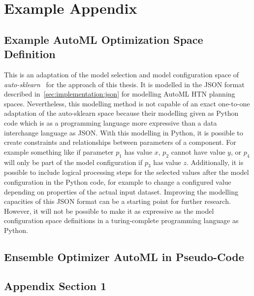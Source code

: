 %
\chapter{Example Appendix}
\label{sec:appendix}

\Blindtext[1][1]

\section{Example AutoML Optimization Space Definition}
\label{sec:appendix:htn-space}
This is an adaptation of the model selection and model configuration space of \textit{auto-sklearn}~\cite{Feurer-AutoSklearn} for the approach of this thesis.
It is modelled in the JSON format described in~\ref{sec:implementation:json} for modelling AutoML HTN planning spaces.\newline
Nevertheless, this modelling method is not capable of an exact one-to-one adaptation of the auto-sklearn space because their modelling given as Python code which is as a programming language more expressive than a data interchange language as JSON.
With this modelling in Python, it is possible to create constraints and relationships between parameters of a component.
For example something like if parameter $p_1$ has value $x$, $p_2$ cannot have value $y$, or $p_4$ will only be part of the model configuration if $p_3$ has value $z$.
Additionally, it is possible to include logical processing steps for the selected values after the model configuration in the Python code, for example to change a configured value depending on properties of the actual input dataset.\newline
Improving the modelling capacities of this JSON format can be a starting point for further research.
However, it will not be possible to make it as expressive as the model configuration space definitions in a turing-complete programming language as Python.

\Blindtext[1][1]

\section{Ensemble Optimizer AutoML in Pseudo-Code}
\label{sec:appendix:pseudo-code}

\Blindtext[1][1]

\section{Appendix Section 1}
\label{sec:appendix:sec1}

